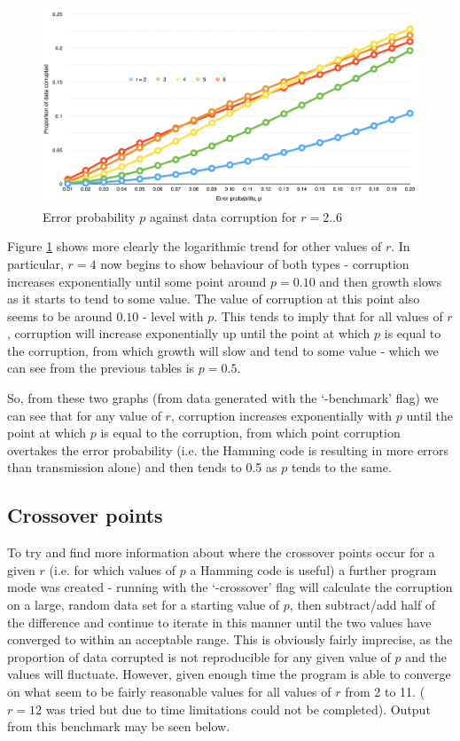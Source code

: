 \documentclass[a4paper,11pt]{article}
\begin{document}
        \begin{figure}[h]
            \caption{Error probability $p$ against data corruption for $r = 2..6$}
            \label{fig:graph2}
            \centering
            \includegraphics[width=\textwidth]{graph2}
        \end{figure}

        Figure \ref{fig:graph2} shows more clearly the logarithmic trend for other values of $r$. In particular, $r = 4$ now begins to show behaviour of both types - corruption increases exponentially until some point around $p = 0.10$ and then growth slows as it starts to tend to some value. The value of corruption at this point also seems to be around $0.10$ - level with $p$. This tends to imply that for all values of $r$, corruption will increase exponentially up until the point at which $p$ is equal to the corruption, from which growth will slow and tend to some value - which we can see from the previous tables is $p = 0.5$.

        So, from these two graphs (from data generated with the `-benchmark' flag) we can see that for any value of $r$, corruption increases exponentially with $p$ until the point at which $p$ is equal to the corruption, from which point corruption overtakes the error probability (i.e. the Hamming code is resulting in more errors than transmission alone) and then tends to 0.5 as $p$ tends to the same.

        \subsection{Crossover points}
            To try and find more information about where the crossover points occur for a given $r$ (i.e. for which values of $p$ a Hamming code is useful) a further program mode was created - running with the `-crossover' flag will calculate the corruption on a large, random data set for a starting value of $p$, then subtract/add half of the difference and continue to iterate in this manner until the two values have converged to within an acceptable range. This is obviously fairly imprecise, as the proportion of data corrupted is not reproducible for any given value of $p$ and the values will fluctuate. However, given enough time the program is able to converge on what seem to be fairly reasonable values for all values of $r$ from 2 to 11. ($r = 12$ was tried but due to time limitations could not be completed). Output from this benchmark may be seen below.
\end{document}
